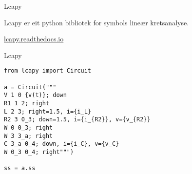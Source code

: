 \begin{frame}{Lcapy}

Lcapy er eit python bibliotek for symbols lineær kretsanalyse.

  \href{https://lcapy.readthedocs.io/en/latest/}{lcapy.readthedocs.io}
  
\end{frame}


\begin{frame}[containsverbatim]{Lcapy}
	
\begin{verbatim}
from lcapy import Circuit
		
a = Circuit("""
V 1 0 {v(t)}; down
R1 1 2; right
L 2 3; right=1.5, i={i_L}
R2 3 0_3; down=1.5, i={i_{R2}}, v={v_{R2}}
W 0 0_3; right
W 3 3_a; right
C 3_a 0_4; down, i={i_C}, v={v_C}
W 0_3 0_4; right""")
		
ss = a.ss
\end{verbatim}
	
\end{frame}